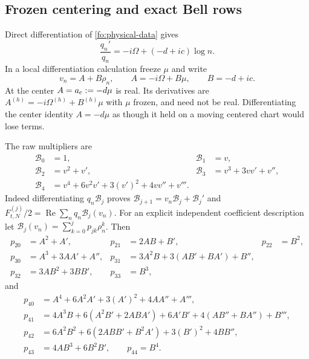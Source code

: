 \documentclass[11pt]{article}
\numberwithin{equation}{section}
\theoremstyle{definition}
\theoremstyle{remark}
\begin{document}
\subsection{Frozen centering and exact Bell rows}
\label{fo:raw-jets}
Direct differentiation of \eqref{fo:physical-data} gives
\begin{equation}
\frac{q_n'}{q_n}=-i\Omega+(-d+ic)\log n.
\label{fo:log-derivative}
\end{equation}
In a local differentiation calculation freeze $\mu$ and write
\begin{equation}
v_n=A+B\rho_n,\qquad A=-i\Omega+B\mu,\qquad B=-d+ic.
\label{fo:AB}
\end{equation}
At the center $A=a_{\rm c}:=-d\mu$ is real.  Its derivatives are
$A^{(h)}=-i\Omega^{(h)}+B^{(h)}\mu$ with $\mu$ frozen, and need not
be real.  Differentiating the center identity $A=-d\mu$ as though it
held on a moving centered chart would lose terms.

The raw multipliers are
\begin{align}
\mathcal B_0&=1,&\mathcal B_1&=v,\nonumber\\
\mathcal B_2&=v^2+v',&
\mathcal B_3&=v^3+3vv'+v'',\label{fo:Bell}\\
\mathcal B_4&=v^4+6v^2v'+3(v')^2+4vv''+v'''.\nonumber
\end{align}
Indeed differentiating $q_n\mathcal B_j$ proves
$\mathcal B_{j+1}=v_n\mathcal B_j+\mathcal B_j'$ and
$F_{t,N}^{(j)}/2=\operatorname{Re}\sum_n q_n\mathcal B_j(v_n)$.
For an explicit independent coefficient description let
$\mathcal B_j(v_n)=\sum_{k=0}^j p_{jk}\rho_n^k$.  Then
\begin{align}
p_{20}&=A^2+A',&p_{21}&=2AB+B',&p_{22}&=B^2,\nonumber\\
p_{30}&=A^3+3AA'+A'',&
p_{31}&=3A^2B+3(AB'+BA')+B'',\label{fo:Bell-rows}\\
p_{32}&=3AB^2+3BB',&p_{33}&=B^3,\nonumber
\end{align}
and
\begin{align}
p_{40}&=A^4+6A^2A'+3(A')^2+4AA''+A''',\nonumber\\
p_{41}&=4A^3B+6(A^2B'+2ABA')+6A'B'
                  +4(AB''+BA'')+B''',\nonumber\\
p_{42}&=6A^2B^2+6(2ABB'+B^2A')+3(B')^2+4BB'',
 \label{fo:fourth-row}\\
p_{43}&=4AB^3+6B^2B',\qquad p_{44}=B^4.\nonumber
\end{align}
\end{document}
